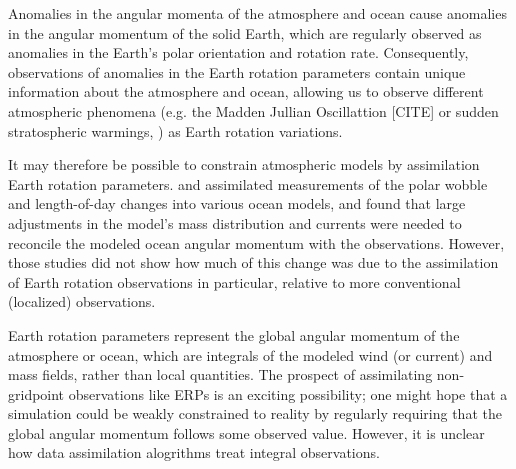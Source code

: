 
Anomalies in the  angular momenta of the atmosphere and ocean cause anomalies in the angular momentum of the solid Earth, which are regularly observed as anomalies in the Earth's polar orientation and rotation rate.
Consequently, observations of anomalies in the Earth rotation parameters contain unique information about the atmosphere and ocean, allowing us to observe different atmospheric phenomena (e.g. the Madden Jullian Oscillattion [CITE] or sudden stratospheric warmings, \citet{Neef2014}) as Earth rotation variations. 

It may therefore be possible to constrain atmospheric models by assimilation Earth rotation parameters. 
\cite{Saynisch2011,Saynisch2010} and \cite{Saynisch2012} assimilated measurements of the polar wobble and length-of-day changes into various ocean models, and found that large adjustments in the model's mass distribution and currents were needed to reconcile the modeled ocean angular momentum with the observations. 
However, those studies did not show how much of this change was due to the assimilation of Earth rotation observations in particular, relative to more conventional (localized) observations. 

Earth rotation parameters represent the global angular momentum of the atmosphere or ocean, which are integrals of the modeled wind (or current) and mass fields, rather than local quantities.
The prospect of assimilating non-gridpoint observations like ERPs is an exciting possibility; one might hope that a simulation could be weakly constrained to reality by regularly requiring that the global angular momentum follows some observed value.
However, it is unclear how data assimilation alogrithms treat integral observations.

